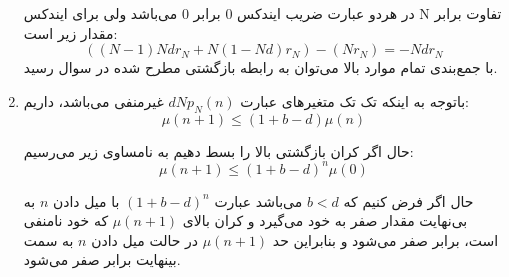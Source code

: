 \begin{enumerate}[label=(\alph*)]
	در هردو عبارت ضریب ایندکس 0 برابر 0 می‌باشد ولی برای ایندکس N تفاوت برابر مقدار زیر است:
	$$
	\left( {\left( {N - 1} \right)Nd{r_N} + N\left( {1 - Nd} \right){r_N}} \right) - \left( {N{r_N}} \right) =  - Nd{r_N}
	$$
	با جمع‌بندی تمام موارد بالا می‌توان به رابطه بازگشتی مطرح شده در سوال رسید.
	
	\item
	
	باتوجه به اینکه تک تک متغیرهای عبارت
	$dN{p_N}\left( n \right)$
	غیرمنفی می‌باشد،‌ داریم:
	$$
	\mu \left( {n + 1} \right) \le (1 + b - d)\mu \left( n \right)
	$$
	
	حال اگر کران بازگشتی بالا را بسط دهیم به نامساوی زیر می‌رسیم:
	$$
	\mu \left( {n + 1} \right) \le {(1 + b - d)^n}\mu \left( 0 \right)
	$$
	
	حال اگر فرض کنیم که
	$b<d$
	می‌باشد عبارت
	${(1 + b - d)^n}$
	با میل دادن $n$ به بی‌نهایت مقدار صفر به خود می‌گیرد و کران بالای
	$\mu \left( {n + 1} \right)$
	که خود نامنفی است،‌ برابر صفر می‌شود و بنابراین حد
	$\mu \left( {n + 1} \right)$
	در حالت میل دادن $n$ به سمت بینهایت برابر صفر می‌شود.
\end{enumerate}
